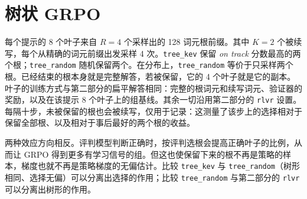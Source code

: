 \section{树状 GRPO}\label{sec:tree}

每个提示的 8 个叶子来自 $R=4$ 个采样出的 128 词元根前缀。其中 $K=2$ 个被续写，每个从精确的词元前缀出发采样 4 次。\texttt{tree\_kev} 保留 \kev{} \emph{on track} 分数最高的两个根；\texttt{tree\_random} 随机保留两个。在分布上，\texttt{tree\_random} 等价于只采样两个根。已经结束的根本身就是完整解答，若被保留，它的 4 个叶子就是它的副本。叶子的训练方式与第二部分的扁平解答相同：完整的根词元和续写词元、验证器的奖励，以及在该提示 8 个叶子上的组基线。其余一切沿用第二部分的 \texttt{rlvr} 设置。每隔十步，未被保留的根也会被续写，仅用于记录：这测量了该步上的选择相对于保留全部根、以及相对于事后最好的两个根的收益。

两种效应方向相反。评判模型判断正确时，按评判选根会提高正确叶子的比例，从而让 GRPO 得到更多有学习信号的组。但这也使保留下来的根不再是策略的样本，梯度也就不再是策略梯度的无偏估计。比较 \texttt{tree\_kev} 与 \texttt{tree\_random}（树形相同、选择无偏）可以分离出选择的作用；比较 \texttt{tree\_random} 与第二部分的 \texttt{rlvr} 可以分离出树形的作用。
